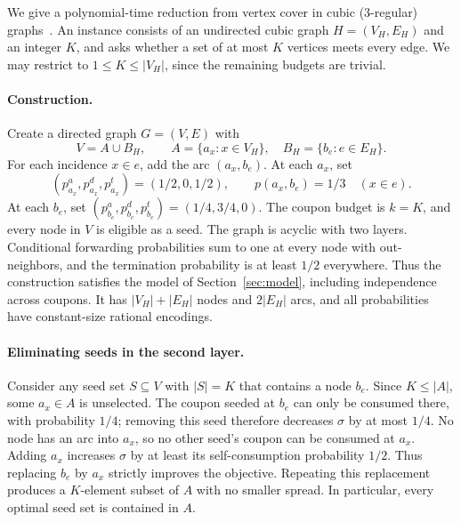 \documentclass[sigconf]{acmart}
\begin{document}
We give a polynomial-time reduction from vertex cover in cubic
(3-regular) graphs~\cite{garey1976simplified}. An instance consists of
an undirected cubic graph $H=(V_H,E_H)$ and an integer $K$, and asks
whether a set of at most $K$ vertices meets every edge. We may restrict
to $1\leq K\leq |V_H|$, since the remaining budgets are trivial.

\paragraph{Construction.}
Create a directed graph $G=(V,E)$ with
\[
  V=A\cup B_H,\qquad
  A=\{a_x:x\in V_H\},\quad B_H=\{b_e:e\in E_H\}.
\]
For each incidence $x\in e$, add the arc $(a_x,b_e)$.
At each $a_x$, set
\[
  (p_{a_x}^a,p_{a_x}^d,p_{a_x}^t)=(1/2,0,1/2),
  \qquad p(a_x,b_e)=1/3\quad(x\in e).
\]
At each $b_e$, set
$(p_{b_e}^a,p_{b_e}^d,p_{b_e}^t)=(1/4,3/4,0)$.
The coupon budget is $k=K$, and every node in $V$ is eligible as a
seed. The graph is acyclic with two layers. Conditional forwarding
probabilities sum to one at every node with out-neighbors, and the
termination probability is at least $1/2$ everywhere. Thus the
construction satisfies the model of Section~\ref{sec:model}, including
independence across coupons. It has $|V_H|+|E_H|$ nodes and $2|E_H|$
arcs, and all probabilities have constant-size rational encodings.

\paragraph{Eliminating seeds in the second layer.}
Consider any seed set $S\subseteq V$ with $|S|=K$ that contains a node
$b_e$. Since $K\leq |A|$, some $a_x\in A$ is unselected. The coupon
seeded at $b_e$ can only be consumed there, with probability $1/4$;
removing this seed therefore decreases $\sigma$ by at most $1/4$.
No node has an arc into $a_x$, so no other seed's coupon can be
consumed at $a_x$. Adding $a_x$ increases $\sigma$ by at least its
self-consumption probability $1/2$. Thus replacing $b_e$ by $a_x$
strictly improves the objective. Repeating this replacement produces
a $K$-element subset of $A$ with no smaller spread. In particular,
every optimal seed set is contained in $A$.
\end{document}
